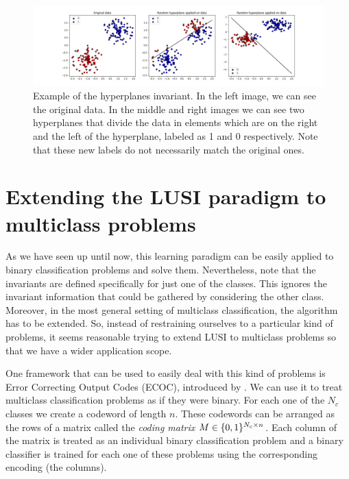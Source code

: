 \begin{figure}[h]
    \centering
    \includegraphics[width=\textwidth]{thesis/Figures/random_hyperplanes_example.png}
    \caption{Example of the hyperplanes invariant. In the left image, we can see the original data. In
    the middle and right images we can see two hyperplanes that divide the data in elements which are
    on the right and the left of the hyperplane, labeled as 1 and 0 respectively. Note that these
    new labels do not necessarily match the original ones.}
    \label{fig:random_hyperplanes_example}
\end{figure}

\section{Extending the LUSI paradigm to multiclass problems}

As we have seen up until now, this learning paradigm can be easily applied to binary classification problems
and solve them. Nevertheless, note that the invariants are defined specifically for just one of the classes. This ignores the invariant information that could be gathered by considering the other class. Moreover, in the most general setting of multiclass classification, the algorithm has to be extended. So, instead of restraining ourselves to a particular kind of problems, it seems reasonable trying to extend
LUSI to multiclass problems so that we have a wider application scope.

One framework that can be used to easily deal with this kind of problems is Error Correcting Output Codes (ECOC),
introduced by \cite{DietrichBakiri1995}. We can use it to treat multiclass classification problems as if they
were binary. For each one of the $N_c$ classes we create a codeword of length $n$. These codewords can be arranged as
the rows of a matrix called the \emph{coding matrix} $M \in \lbrace 0, 1 \rbrace^{N_c \times n}$. Each column of the matrix
is treated as an individual binary classification problem and a binary classifier is trained for each one of these
problems using the corresponding encoding (the columns).

